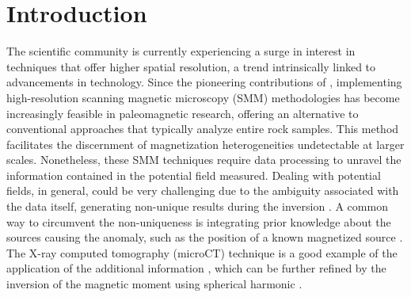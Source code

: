 \section{Introduction}

The scientific community is currently experiencing a surge in interest in techniques that offer higher spatial resolution, a trend intrinsically linked to advancements in technology. Since the pioneering contributions of \citet{Egli2000}, implementing high-resolution scanning magnetic microscopy (SMM) methodologies has become increasingly feasible in paleomagnetic research, offering an alternative to conventional approaches that typically analyze entire rock samples. This method facilitates the discernment of magnetization heterogeneities undetectable at larger scales. Nonetheless, these SMM techniques require data processing to unravel the information contained in the potential field measured. Dealing with potential fields, in general, could be very challenging due to the ambiguity associated with the data itself, generating non-unique results during the inversion \citep{Blakely1996}. A common way to circumvent the non-uniqueness is integrating prior knowledge about the sources causing the anomaly, such as the position of a known magnetized source \citep{Fabian2019}. The X-ray computed tomography (microCT) technique is a good example of the application of the additional information \citep[\textit{e.g.}][]{DeGroot2018, DeGroot2021, Koster2023}, which can be further refined by the inversion of the magnetic moment using spherical harmonic \citep[\textit{e.g.}][]{CortesOrtuno2021, CortesOrtuno2022}.

